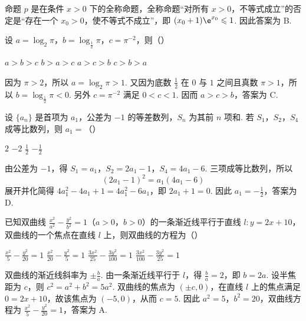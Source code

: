 
\begin{solution}
命题 \(p\) 是在条件 \(x>0\) 下的全称命题，全称命题“对所有 \(x>0\)，不等式成立”的否定是“存在一个 \(x_0>0\)，使不等式不成立”，即 \((x_0+1)\e^{x_0}\leqslant1\). 因此答案为 B.
\end{solution}

\begin{problem}
设 \(a = \log_2\pi\)，\(b = \log_{\frac{1}{2}}\pi\)，\(c = \pi^{-2}\)，则（\quad）

\choices
    {\(a > b > c\)}
    {\(b > a > c\)}
    {\(a > c > b\)}
    {\(c > b > a\)}
\end{problem}


\begin{solution}
因为 \(\pi>2\)，所以 \(a=\log_2\pi>1\). 又因为底数 \(\frac12\) 在 \(0\) 与 \(1\) 之间且真数 \(\pi>1\)，所以 \(b=\log_{\frac{1}{2}}\pi<0\). 另外 \(c=\pi^{-2}\) 满足 \(0<c<1\). 因而 \(a>c>b\)，答案为 C.
\end{solution}

\begin{problem}
设 \(\{a_n\}\) 是首项为 \(a_1\)，公差为 \(-1\) 的等差数列，\(S_n\) 为其前 \(n\) 项和. 若 \(S_1\)，\(S_2\)，\(S_4\) 成等比数列，则 \(a_1 =\)（\quad）

\choices
    {\(2\)}
    {\(-2\)}
    {\(\frac{1}{2}\)}
    {\(-\frac{1}{2}\)}
\end{problem}


\begin{solution}
由公差为 \(-1\)，得 \(S_1=a_1\)，\(S_2=2a_1-1\)，\(S_4=4a_1-6\). 三项成等比数列，所以
\[
(2a_1-1)^2=a_1(4a_1-6)
\]
展开并化简得 \(4a_1^2-4a_1+1=4a_1^2-6a_1\)，即 \(2a_1+1=0\). 因此 \(a_1=-\frac12\)，答案为 D.
\end{solution}

\begin{problem}
已知双曲线 \(\frac{x^2}{a^2} -\frac{y^2}{b^2} = 1\)（\(a > 0\)，\(b > 0\)）的一条渐近线平行于直线 \(l: y = 2x + 10\)，双曲线的一个焦点在直线 \(l\) 上，则双曲线的方程为（\quad）

\choices
    {\(\frac{x^2}{5} -\frac{y^2}{20} = 1\)}
    {\(\frac{x^2}{20} -\frac{y^2}{5} = 1\)}
    {\(\frac{3x^2}{25} -\frac{3y^2}{100} = 1\)}
    {\(\frac{3x^2}{100} -\frac{3y^2}{25} = 1\)}
\end{problem}


\begin{solution}
双曲线的渐近线斜率为 \(\pm\frac ba\). 由一条渐近线平行于 \(l\)，得 \(\frac ba=2\)，即 \(b=2a\). 设半焦距为 \(c\)，则 \(c^2=a^2+b^2=5a^2\). 双曲线的焦点为 \((\pm c,0)\)，在直线 \(l\) 上的焦点满足 \(0=2x+10\)，故该焦点为 \((-5,0)\)，从而 \(c=5\). 因此 \(a^2=5\)，\(b^2=20\)，双曲线方程为 \(\frac{x^2}{5}-\frac{y^2}{20}=1\)，答案为 A.
\end{solution}

